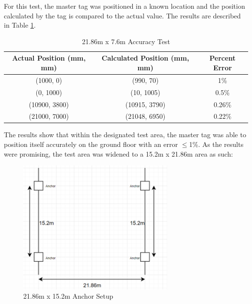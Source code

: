 \documentclass[12pt, a4paper]{article}
\begin{document}
For this test, the master tag was positioned in a known location and the position calculated by the tag is compared to the actual value. The results are described in Table \ref{tab:res1}.
\begin{center}
    \begin{table}[h]
        \begin{adjustbox}{width=1\textwidth, center=\textwidth}
            \small
            \begin{tabular}{||c c c||}
                \hline
                Actual Position (mm, mm) & Calculated Position (mm, mm) & Percent Error \\
                \hline
                (1000, 0) & (990, 70) & 1\% \\
                \hline
                (0, 1000) & (10, 1005) & 0.5\% \\
                \hline
                (10900, 3800) & (10915, 3790) & 0.26\% \\
                \hline
                (21000, 7000) & (21048, 6950) & 0.22\% \\
                \hline
            \end{tabular}
        \end{adjustbox}
        \caption{21.86m x 7.6m Accuracy Test}
        \label{tab:res1}
    \end{table}
\end{center}
The results show that within the designated test area, the master tag was able to position itself accurately on the ground floor with an error
$\leq$1\%. As the results were promising, the test area was widened to a 15.2m x 21.86m area as such:
\begin{figure}[H]
    \centering
    \includegraphics[width=0.7\textwidth]{setup2.png}
    \caption{21.86m x 15.2m Anchor Setup}
\end{figure}
\end{document}

